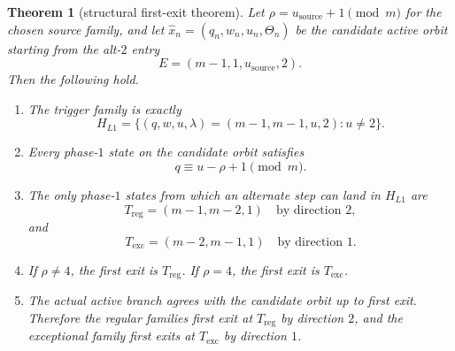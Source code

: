 \documentclass[11pt]{article}
\newtheorem{theorem}{Theorem}[section]
\begin{document}
\begin{theorem}[structural first-exit theorem]
Let $\rho = u_{\mathrm{source}} + 1 \pmod m$ for the chosen source family, and
let $\widehat x_n=(q_n,w_n,u_n,\Theta_n)$ be the candidate active orbit
starting from the alt-$2$ entry
\[
E=(m-1,1,u_{\mathrm{source}},2).
\]
Then the following hold.
\begin{enumerate}[label=\textup{(\arabic*)},leftmargin=2.5em]
\item The trigger family is exactly
\[
H_{L1}=\{(q,w,u,\lambda)=(m-1,m-1,u,2):u\neq 2\}.
\]
\item Every phase-$1$ state on the candidate orbit satisfies
\[
q \equiv u-\rho+1 \pmod m.
\]
\item The only phase-$1$ states from which an alternate step can land in
$H_{L1}$ are
\[
T_{\mathrm{reg}}=(m-1,m-2,1) \quad \text{by direction } 2,
\]
and
\[
T_{\mathrm{exc}}=(m-2,m-1,1) \quad \text{by direction } 1.
\]
\item If $\rho\neq 4$, the first exit is $T_{\mathrm{reg}}$. If $\rho=4$, the
first exit is $T_{\mathrm{exc}}$.
\item The actual active branch agrees with the candidate orbit up to first
exit. Therefore the regular families first exit at $T_{\mathrm{reg}}$ by
direction $2$, and the exceptional family first exits at $T_{\mathrm{exc}}$ by
direction $1$.
\end{enumerate}
\end{theorem}
\end{document}
